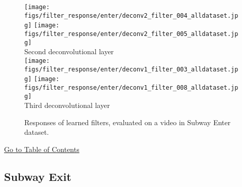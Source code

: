\documentclass[10pt,twocolumn,letterpaper]{article}
\begin{document}
\begin{figure}[h]
	\texttt{[image: figs/filter\_response/enter/deconv2\_filter\_004\_alldataset.jpg]}
	\texttt{[image: figs/filter\_response/enter/deconv2\_filter\_005\_alldataset.jpg]}\\
	{\footnotesize Second deconvolutional layer}\\
	\texttt{[image: figs/filter\_response/enter/deconv1\_filter\_003\_alldataset.jpg]}
	\texttt{[image: figs/filter\_response/enter/deconv1\_filter\_008\_alldataset.jpg]}\\
	{\footnotesize Third deconvolutional layer}\\
	\caption{Responses of learned filters, evaluated on a video in Subway Enter dataset.}
\end{figure}

\begin{center}
	\hyperlink{page.11}{Go to Table of Contents}
\end{center}

\clearpage

\subsection{Subway Exit}
\label{sec:filter_res_vis_exit}
\end{document}
